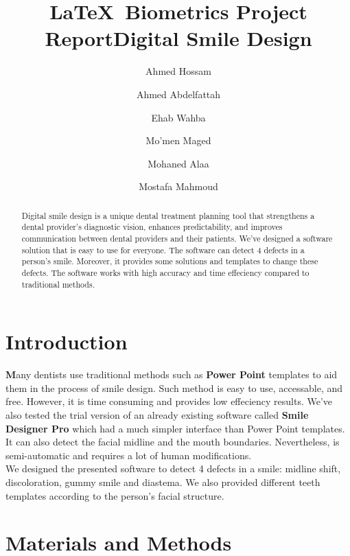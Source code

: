 \documentclass[conference,twocolumn]{IEEEtran}
\begin{document}
\title{\LaTeX\ Biometrics Project Report}

\title{Digital Smile Design}
\author[1]{Ahmed Hossam}
\author[1]{Ahmed Abdelfattah }
\author[1]{Ehab Wahba }
\author[1]{Mo'men Maged}
\author[1]{Mohaned Alaa }
\author[1]{Mostafa Mahmoud}


\renewcommand\Authands{ and }

\maketitle
\pagestyle{plain}

\begin{abstract}
    Digital smile design is a unique dental treatment planning tool that strengthens a dental provider's diagnostic vision, enhances predictability, and improves communication between dental providers and their patients.
    We've designed a software solution that is easy to use for everyone. The software can detect 4 defects in a person's smile. Moreover, it provides some solutions and templates to change these defects.
    The software works with high accuracy and time effeciency compared to traditional methods.
\end{abstract}
\section{\textbf{Introduction}}
\textbf {M}any dentists use traditional methods such as \textbf{Power Point} templates to aid them in the process of smile design. 
 Such method is easy to use, accessable, and free. However, it is time consuming and provides low effeciency results.
 We've also tested the trial version of an already existing software called \textbf{Smile Designer Pro} which had a much simpler interface than Power Point templates. It can also detect the facial midline and the mouth boundaries.
 Nevertheless, is semi-automatic and requires a lot of human modifications.\\
 We designed the presented software to detect 4 defects in a smile: midline shift, discoloration, gummy smile and diastema.
 We also provided different teeth templates according to the person's facial structure.
 

\section{\textbf{Materials and Methods}}
\end{document}
